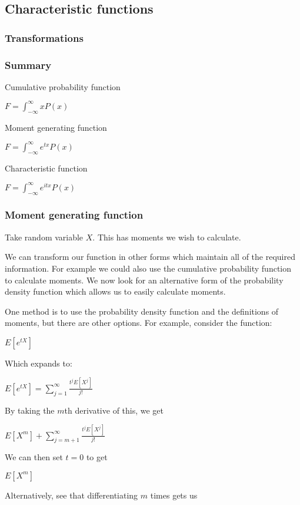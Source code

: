 
\subsection{Characteristic functions}

\subsubsection{Transformations}

\subsubsection{Summary}

Cumulative probability function

$F=\int_{-\infty }^\infty xP(x)$

Moment generating function

$F=\int_{-\infty }^\infty e^{tx}P(x)$

Characteristic function

$F=\int_{-\infty }^\infty e^{itx}P(x)$

\subsubsection{Moment generating function}

Take random variable \(X\). This has moments we wish to calculate.

We can transform our function in other forms which maintain all of the required information. For example we could also use the cumulative probability function to calculate moments. We now look for an alternative form of the probability density function which allows us to easily calculate moments.

One method is to use the probability density function and the definitions of moments, but there are other options. For example, consider the function:

$E[e^{tX}]$

Which expands to:

$E[e^{tX}]=\sum_{j=1}^\infty \frac{t^jE[X^j]}{j!}$

By taking the \(m\)th derivative of this, we get

$E[X^m]+\sum_{j=m+1}^\infty \frac{t^jE[X^j]}{j!}$

We can then set \(t=0\) to get

$E[X^m]$

Alternatively, see that differentiating \(m\) times gets us

